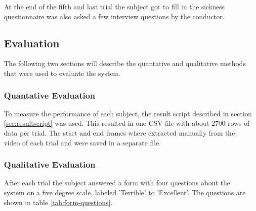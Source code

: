 \documentclass[nofilelist]{cslthse-msc}
\begin{document}
At the end of the fifth and last trial the subject got to fill in the sickness questionnaire was also asked a few interview questions by the conductor.

\subsection{Evaluation}
The following two sections will describe the quantative and qualitative methods that were used to evaluate the system.

\subsubsection{Quantative Evaluation}
To measure the performance of each subject, the result script described in section \ref{sec:resultscript} was used. This resulted in one CSV-file with about 2700 rows of data per trial. The start and end frames where extracted manually from the video of each trial and were saved in a separate file.  

\subsubsection{Qualitative Evaluation}
After each trial the subject answered a form with four questions about the system on a five degree scale, labeled 'Terrible' to 'Excellent'. The questions are shown in table \ref{tab:form-questions}. 

\setlength{\extrarowheight}{5pt}
\vspace{10pt}
\end{document}
